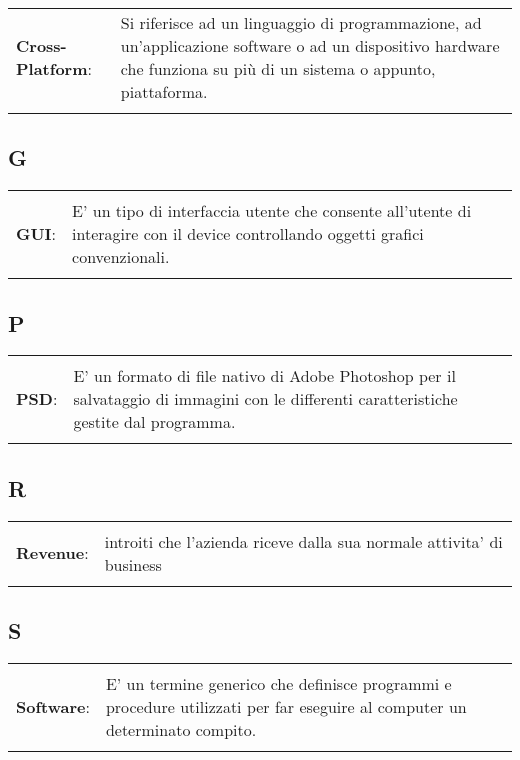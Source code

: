 {{{\begin{longtable}{p{} p{}}
		\\
		\textbf{Cross-Platform}:		&	 Si riferisce ad un linguaggio di programmazione, ad un'applicazione software o ad un dispositivo hardware che funziona su più di un sistema o appunto, piattaforma.\\
	\end{longtable}
	
	\subsection{G}{
		\normalsize
		\begin{longtable}{p{} p{}} 
			\\
			\textbf{GUI}:		&	 E' un tipo di interfaccia utente che consente all'utente di interagire con il device controllando oggetti grafici convenzionali.\\
		\end{longtable}

	\subsection{P}{
		\normalsize
		\begin{longtable}{p{} p{}} 
			\\
			\textbf{PSD}:		&	 E' un formato di file nativo di Adobe Photoshop per il salvataggio di immagini con le differenti caratteristiche gestite dal programma. \\
		\end{longtable}

	\subsection{R}{
		\normalsize
		\begin{longtable}{p{} p{}} 
			\\
			\textbf{Revenue}:		&	 introiti che l'azienda riceve dalla sua normale attivita' di business\\
		\end{longtable}
	
	
	\subsection{S}{
		\normalsize
		\begin{longtable}{p{} p{}} 
			\\
			\textbf{Software}:		&	 E' un termine generico che definisce programmi e procedure utilizzati per far eseguire al computer un determinato compito. \\
		\end{longtable}
		
}}}}}}}
